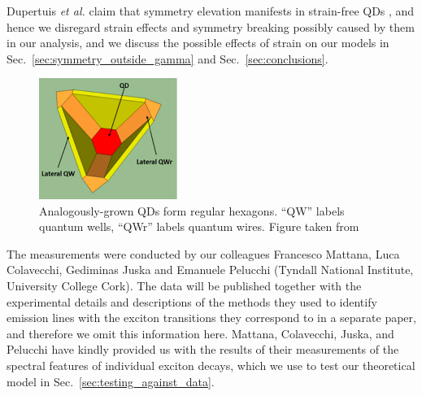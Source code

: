 \documentclass[12pt]{article}
\numberwithin{equation}{section}
\begin{document}
Dupertuis \textit{et al.} claim that symmetry elevation manifests in strain-free QDs \cite[p.~4]{dupertuis}, and hence we disregard strain effects and symmetry breaking possibly caused by them in our analysis, and we discuss the possible effects of strain on our models in Sec.~\ref{sec:symmetry_outside_gamma} and Sec.~\ref{sec:conclusions}.

\begin{figure}
\begin{center}
    \includegraphics[width=0.4\textwidth]{figures/hexagonal_qds}
 \caption{Analogously-grown QDs form regular hexagons. ``QW'' labels quantum wells, ``QWr'' labels quantum wires. Figure taken from \cite[Fig.~1]{hexagon}\label{fig:hexagonal_qds}}
\end{center}
\end{figure}

The measurements were conducted by our colleagues Francesco Mattana, Luca Colavecchi, Gediminas Juska and Emanuele Pelucchi (Tyndall National Institute, University College Cork). The data will be published together with the experimental details and descriptions of the methods they used to identify emission lines with the exciton transitions they correspond to in a separate paper, and therefore we omit this information here. Mattana, Colavecchi, Juska, and Pelucchi have kindly provided us with the results of their measurements of the spectral features of individual exciton decays, which we use to test our theoretical model in Sec.~\ref{sec:testing_against_data}. 

\pagebreak








\end{document}

